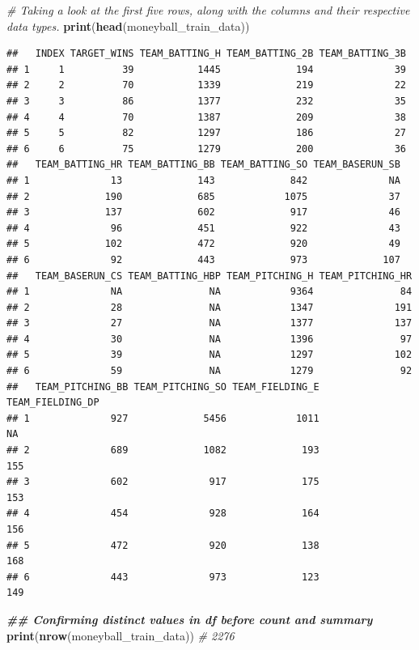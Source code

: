 \documentclass[
]{article}
\newenvironment{Shaded}{\begin{snugshade}}{\end{snugshade}}
\newcommand{\CommentTok}[1]{\textcolor[rgb]{0.56,0.35,0.01}{\textit{#1}}}
\newcommand{\DocumentationTok}[1]{\textcolor[rgb]{0.56,0.35,0.01}{\textbf{\textit{#1}}}}
\newcommand{\FunctionTok}[1]{\textcolor[rgb]{0.13,0.29,0.53}{\textbf{#1}}}
\newcommand{\NormalTok}[1]{#1}
\begin{document}
\begin{Shaded}
\begin{Highlighting}[]
\CommentTok{\# Taking a look at the first five rows, along with the columns and their respective data types. }
\FunctionTok{print}\NormalTok{(}\FunctionTok{head}\NormalTok{(moneyball\_train\_data))}
\end{Highlighting}
\end{Shaded}

\begin{verbatim}
##   INDEX TARGET_WINS TEAM_BATTING_H TEAM_BATTING_2B TEAM_BATTING_3B
## 1     1          39           1445             194              39
## 2     2          70           1339             219              22
## 3     3          86           1377             232              35
## 4     4          70           1387             209              38
## 5     5          82           1297             186              27
## 6     6          75           1279             200              36
##   TEAM_BATTING_HR TEAM_BATTING_BB TEAM_BATTING_SO TEAM_BASERUN_SB
## 1              13             143             842              NA
## 2             190             685            1075              37
## 3             137             602             917              46
## 4              96             451             922              43
## 5             102             472             920              49
## 6              92             443             973             107
##   TEAM_BASERUN_CS TEAM_BATTING_HBP TEAM_PITCHING_H TEAM_PITCHING_HR
## 1              NA               NA            9364               84
## 2              28               NA            1347              191
## 3              27               NA            1377              137
## 4              30               NA            1396               97
## 5              39               NA            1297              102
## 6              59               NA            1279               92
##   TEAM_PITCHING_BB TEAM_PITCHING_SO TEAM_FIELDING_E TEAM_FIELDING_DP
## 1              927             5456            1011               NA
## 2              689             1082             193              155
## 3              602              917             175              153
## 4              454              928             164              156
## 5              472              920             138              168
## 6              443              973             123              149
\end{verbatim}

\begin{Shaded}
\begin{Highlighting}[]
\DocumentationTok{\#\# Confirming distinct values in df before count and summary }
\FunctionTok{print}\NormalTok{(}\FunctionTok{nrow}\NormalTok{(moneyball\_train\_data)) }\CommentTok{\# 2276}
\end{Highlighting}
\end{Shaded}
\end{document}
